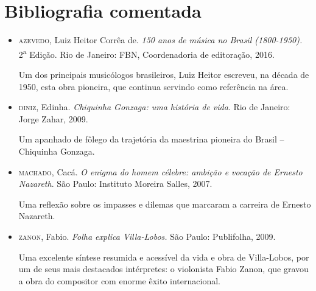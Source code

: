\documentclass[11pt]{extarticle}
\begin{document}
\section{Bibliografia comentada}

\begin{itemize}

\item 
\textsc{azevedo}, Luiz Heitor Corrêa de. \emph{150 anos de música no Brasil
(1800-1950).} 2\textsuperscript{a} Edição. Rio de Janeiro: FBN,
Coordenadoria de editoração, 2016.


Um dos principais musicólogos brasileiros, Luiz Heitor escreveu,
na década de 1950, esta obra pioneira, que continua servindo como
referência na área.

\item 
\textsc{diniz}, Edinha. \emph{Chiquinha Gonzaga: uma história de vida}. Rio de
Janeiro: Jorge Zahar, 2009.

Um apanhado de fôlego da trajetória da maestrina pioneira do
Brasil -- Chiquinha Gonzaga.

\item 
\textsc{machado}, Cacá. \emph{O enigma do homem célebre: ambição e vocação de
Ernesto Nazareth}. São Paulo: Instituto Moreira Salles, 2007.

Uma reflexão sobre os impasses e dilemas que marcaram a carreira
de Ernesto Nazareth.

\item 
\textsc{zanon}, Fabio. \emph{Folha explica Villa-Lobos.} São Paulo: Publifolha,
2009.

Uma excelente síntese resumida e acessível da vida e obra de
Villa-Lobos, por um de seus mais destacados intérpretes: o violonista
Fabio Zanon, que gravou a obra do compositor com enorme êxito
internacional.
\end{itemize}
\end{document}
